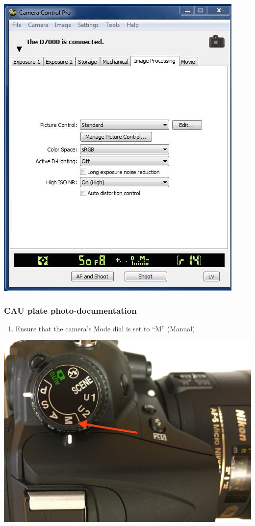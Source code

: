 \documentclass[]{book}
\providecommand{\tightlist}{%
  \setlength{\itemsep}{0pt}\setlength{\parskip}{0pt}}
\begin{document}
\includegraphics{images/Camera6.jpg}

\hypertarget{cau-plate-photo-documentation}{%
\subsubsection{CAU plate photo-documentation}\label{cau-plate-photo-documentation}}

\begin{enumerate}
\def\labelenumi{\arabic{enumi}.}
\tightlist
\item
  Ensure that the camera's Mode dial is set to ``M'' (Manual)
\end{enumerate}

\includegraphics{images/Camera7.jpg}
\end{document}
